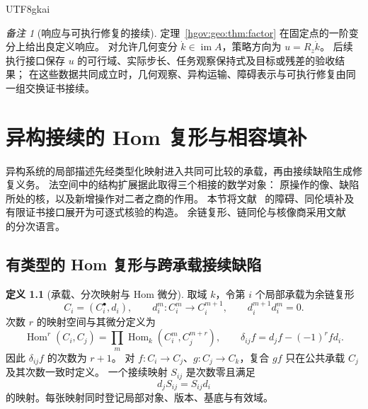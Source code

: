 \documentclass[12pt,a4paper,openany,notitlepage]{report}
\theoremstyle{plain}
\theoremstyle{definition}
\newtheorem{definition}[theorem]{定义}
\theoremstyle{remark}
\newtheorem{remark}[theorem]{备注}
\def\mathcal#1{#1}\def\mathsf#1{#1}\def\mathbb#1{#1}%
\begin{document}
\begin{CJK*}{UTF8}{gkai}
\begin{remark}[响应与可执行修复的接续]
定理~\ref{hgov:geo:thm:factor} 在固定点的一阶变分上给出良定义响应。
对允许几何变分 $\dot k\in\operatorname{im}A$，策略方向为
$u=\mathcal R_z\dot k$。
后续执行接口保存 $u$ 的可行域、实际步长、任务观察保持式及目标或残差的验收结果；
在这些数据共同成立时，几何观察、异构运输、障碍表示与可执行修复由同一组交换证书接续。
\end{remark}



\chapter{异构接续的 Hom 复形与相容填补}
\label{exp:ch:hom}

\label{hgov:homology}

异构系统的局部描述先经类型化映射进入共同可比较的承载，再由接续缺陷生成修复义务。
法空间中的结构扩展据此取得三个相接的数学对象：
原操作的像、缺陷所处的核，以及新增操作对二者之商的作用。
本节将文献~\cite{S01,S37,S38} 的障碍、同伦填补及有限证书接口展开为可逐式核验的构造。
余链复形、链同伦与核像商采用文献~\cite{ExtWeibel,ExtStacks} 的分次语言。

\section{有类型的 Hom 复形与跨承载接续缺陷}
\label{hgov:typed-hom}

\begin{definition}[承载、分次映射与 Hom 微分]
\label{hgov:def-hom}
取域 $\mathbb k$，令第 $i$ 个局部承载为余链复形
\[
 C_i=(C_i^\bullet,d_i),\qquad
 d_i^m:C_i^m\longrightarrow C_i^{m+1},\qquad
 d_i^{m+1}d_i^m=0.
\]
次数 $r$ 的映射空间与其微分定义为
\[
 \operatorname{Hom}^r(C_i,C_j)
 =\prod_m\operatorname{Hom}_{\mathbb k}(C_i^m,C_j^{m+r}),
 \qquad
 \delta_{ij}f=d_jf-(-1)^rfd_i.
\]
因此 $\delta_{ij}f$ 的次数为 $r+1$。
对 $f:C_i\to C_j$、$g:C_j\to C_k$，复合 $gf$ 只在公共承载 $C_j$ 及其次数一致时定义。
一个接续映射 $S_{ij}$ 是次数零且满足
\[
 d_jS_{ij}=S_{ij}d_i
\]
的映射。每张映射同时登记局部对象、版本、基底与有效域。
\end{definition}


\end{CJK*}
\end{document}
